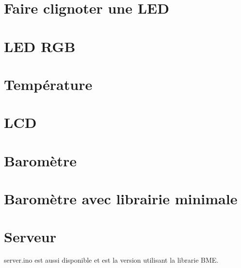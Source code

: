 \documentclass{report}
\begin{document}
	\chapter{Faire clignoter une LED\label{code:led}}
		
			
	\chapter{LED RGB\label{code:rgb}}
		
			
	\chapter{Température\label{code:temp}}
		
			
	\chapter{LCD\label{code:lcd}}
		
	\chapter{Baromètre\label{code:bme}}
		
			
	\chapter{Baromètre avec librairie minimale\label{code:bme2}}
		
		
	\chapter{Serveur}
		
		
		server.ino est aussi disponible et est la version utilisant la librarie BME.
\end{document}
